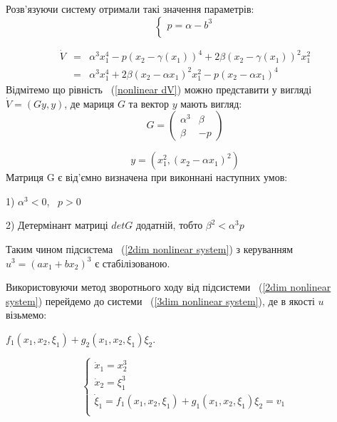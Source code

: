 \documentclass{article}
\begin{document}
Розв'язуючи  систему отримали такі значення параметрів: 
\begin{equation}
    \begin{cases}
        p = \alpha - b^3\\
    \end{cases}
\end{equation}

\begin{eqnarray}\label{nonlinear dV}
    \dot V &=& \alpha^3x_{1}^4 - p(x_2-\gamma(x_1))^4
    +2\beta(x_2-\gamma(x_1))^2x_{1}^2\nonumber\\ 
    &=&\alpha^3x_{1}^4 + 2\beta(x_2-\alpha x_1)^2x_{1}^2
    -p(x_2-\alpha x_1)^4
\end{eqnarray}
Відмітемо що рівність ~(\ref{nonlinear dV}) можно представити у вигляді $\dot V =(Gy,y)$, де 
мариця $G$ та вектор $y$ мають вигляд: 
\begin{equation}
G=\left(\begin{array}{clr}
    \alpha^3 & \beta\\
    \beta & -p
\end{array}\right) 
\end{equation}

\begin{equation}
    y=(x_{1}^2,(x_2-\alpha x_{1})^2)
\end{equation}
Матриця G є від'ємно визначена при виконнані наступних умов:

1) $\alpha^3 < 0$, ~$p > 0$

2) Детермінант матриці $det G$ додатній, тобто $\beta^2<\alpha^3p$ 

Таким чином підсистема ~(\ref{2dim nonlinear system}) з керуванням  $u^3=(ax_1+bx_2)^3$ 
є стабілізованою.
\pagebreak

Використовуючи метод зворотнього ходу від підсистеми ~(\ref{2dim nonlinear system}) 
перейдемо до системи   ~(\ref{3dim nonlinear system}), де  в якості $u$ візьмемо:

$f_1(x_1,x_2,\xi_1)+g_2(x_1,x_2,\xi_1)\xi_2$.

\begin{equation} \label{3dim nonlinear system step2}
    \begin{cases}
        \dot x_1 = x_2^3 \\
        \dot x_2 = \xi_1^3\\
        \dot \xi_1 =f_1(x_1,x_2,\xi_1)+g_1(x_1,x_2,\xi_1)\xi_2 = v_1\\
        \end{cases}
\end{equation}
\end{document}
